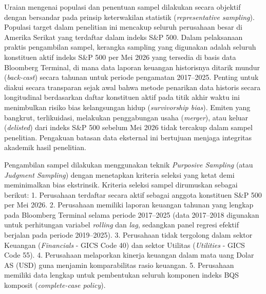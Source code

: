 \documentclass[12pt,a4paper]{article}
\begin{document}
Uraian mengenai populasi dan penentuan sampel dilakukan secara objektif
dengan bersandar pada prinsip keterwakilan statistik
(\emph{representative sampling}). Populasi target dalam penelitian ini
mencakup seluruh perusahaan besar di Amerika Serikat yang terdaftar
dalam indeks S\&P 500. Dalam pelaksanaan praktis pengambilan sampel,
kerangka sampling yang digunakan adalah seluruh konstituen aktif indeks
S\&P 500 per Mei 2026 yang tersedia di basis data Bloomberg Terminal, di
mana data laporan keuangan historisnya ditarik mundur (\emph{back-cast})
secara tahunan untuk periode pengamatan 2017--2025. Penting untuk diakui
secara transparan sejak awal bahwa metode penarikan data historis secara
longitudinal berdasarkan daftar konstituen aktif pada titik akhir waktu
ini menimbulkan risiko bias kelangsungan hidup (\emph{survivorship
bias}). Emiten yang bangkrut, terlikuidasi, melakukan penggabungan usaha
(\emph{merger}), atau keluar (\emph{delisted}) dari indeks S\&P 500
sebelum Mei 2026 tidak tercakup dalam sampel penelitian. Pengakuan
batasan data eksternal ini bertujuan menjaga integritas akademik hasil
penelitian.

Pengambilan sampel dilakukan menggunakan teknik \emph{Purposive
Sampling} (atau \emph{Judgment Sampling}) dengan menetapkan kriteria
seleksi yang ketat demi meminimalkan bias ekstrinsik. Kriteria seleksi
sampel dirumuskan sebagai berikut: 1. Perusahaan terdaftar secara aktif
sebagai anggota konstituen S\&P 500 per Mei 2026. 2. Perusahaan memiliki
laporan keuangan tahunan yang lengkap pada Bloomberg Terminal selama
periode 2017--2025 (data 2017--2018 digunakan untuk perhitungan variabel
\emph{rolling} dan \emph{lag}, sedangkan panel regresi efektif berjalan
pada periode 2019--2025). 3. Perusahaan tidak tergolong dalam sektor
Keuangan (\emph{Financials} - GICS Code 40) dan sektor Utilitas
(\emph{Utilities} - GICS Code 55). 4. Perusahaan melaporkan kinerja
keuangan dalam mata uang Dolar AS (USD) guna menjamin komparabilitas
rasio keuangan. 5. Perusahaan memiliki data lengkap untuk pembentukan
seluruh komponen indeks BQS komposit (\emph{complete-case policy}).
\end{document}
